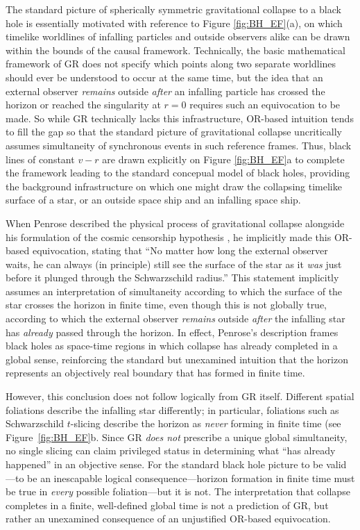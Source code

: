 \documentclass[aps,prd,reprint,superscriptaddress]{revtex4-2}
\begin{document}
The standard picture of spherically symmetric gravitational collapse to a black hole is essentially motivated with reference to Figure \ref{fig:BH_EF}(a), on which timelike worldlines of infalling particles and outside observers alike can be drawn within the bounds of the causal framework. Technically, the basic mathematical framework of GR does not specify which points along two separate worldlines should ever be understood to occur at the same time, but the idea that an external observer \textit{remains} outside \textit{after} an infalling particle has crossed the horizon or reached the singularity at $r=0$ requires such an equivocation to be made. So while GR technically lacks this infrastructure, OR-based intuition tends to fill the gap so that the standard picture of gravitational collapse uncritically assumes simultaneity of synchronous events in such reference frames. Thus, black lines of constant $v-r$ are drawn explicitly on Figure \ref{fig:BH_EF}a to complete the framework leading to the standard concepual model of black holes, providing the background infrastructure on which one might draw the collapsing timelike surface of a star, or an outside space ship and an infalling space ship. 

When Penrose described the physical process of gravitational collapse alongside his formulation of the cosmic censorship hypothesis \cite{Penrose1969,penrose2002}, he implicitly made this OR-based equivocation, stating that ``No matter how long the external observer waits, he can always (in principle) still see the surface of the star as it \textit{was} just before it plunged through the Schwarzschild radius.'' This statement implicitly assumes an interpretation of simultaneity according to which the surface of the star crosses the horizon in finite time, even though this is not globally true, according to which the external observer \textit{remains} outside \textit{after} the infalling star has \textit{already} passed through the horizon. In effect, Penrose's description frames black holes as space-time regions in which collapse has already completed in a global sense, reinforcing the standard but unexamined intuition that the horizon represents an objectively real boundary that has formed in finite time.

However, this conclusion does not follow logically from GR itself. Different spatial foliations describe the infalling star differently; in particular, foliations such as Schwarzschild $t$-slicing describe the horizon as \textit{never} forming in finite time (see Figure~\ref{fig:BH_EF}b. Since GR \textit{does not} prescribe a unique global simultaneity, no single slicing can claim privileged status in determining what ``has already happened'' in an objective sense. For the standard black hole picture to be valid---to be an inescapable logical consequence---horizon formation in finite time must be true in \textit{every} possible foliation---but it is not. The interpretation that collapse completes in a finite, well-defined global time is not a prediction of GR, but rather an unexamined consequence of an unjustified OR-based equivocation.
\end{document}
